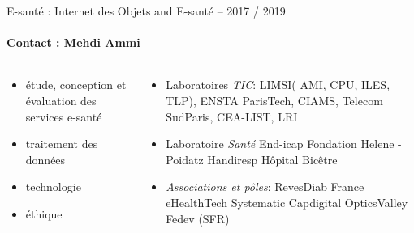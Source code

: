 \begin{frame}{E-santé : Internet des Objets and E-santé -- 2017 / 2019}
\framesubtitle{Contact : Mehdi Ammi}
%
\vspace{-1cm}
\hspace*{-5mm}
{\color{blue} }
%
%
\begin{columns}
  \begin{column}{5.5cm}
    \begin{itemize}
    \item étude, conception et évaluation des services e-sant\'e
    \item traitement des données
    \item technologie
    \item éthique
    \end{itemize}
  \end{column}
  \begin{column}{7cm}
    \begin{itemize}
    \item Laboratoires \textit{TIC}: LIMSI( AMI, CPU, ILES, TLP),
      ENSTA ParisTech, CIAMS, Telecom SudParis, CEA-LIST, LRI
    \item Laboratoire \textit{Santé} End-icap Fondation Helene -
      Poidatz Handiresp Hôpital Bicêtre
    \item \textit{Associations et pôles}: RevesDiab France eHealthTech
      Systematic Capdigital OpticsValley Fedev (SFR)
    \end{itemize}
  \end{column}
\end{columns}
\end{frame}


